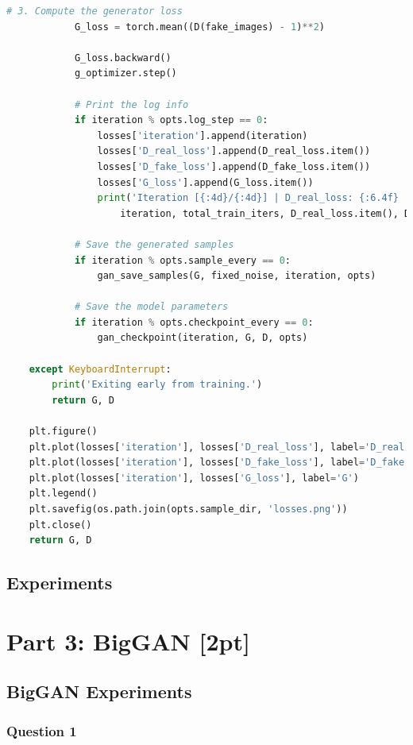 \documentclass{article}
\begin{document}
\begin{lstlisting}[language=python]
            # 3. Compute the generator loss
            G_loss = torch.mean((D(fake_images) - 1)**2)

            G_loss.backward()
            g_optimizer.step()

            # Print the log info
            if iteration % opts.log_step == 0:
                losses['iteration'].append(iteration)
                losses['D_real_loss'].append(D_real_loss.item())
                losses['D_fake_loss'].append(D_fake_loss.item())
                losses['G_loss'].append(G_loss.item())
                print('Iteration [{:4d}/{:4d}] | D_real_loss: {:6.4f} | D_fake_loss: {:6.4f} | G_loss: {:6.4f}'.format(
                    iteration, total_train_iters, D_real_loss.item(), D_fake_loss.item(), G_loss.item()))

            # Save the generated samples
            if iteration % opts.sample_every == 0:
                gan_save_samples(G, fixed_noise, iteration, opts)

            # Save the model parameters
            if iteration % opts.checkpoint_every == 0:
                gan_checkpoint(iteration, G, D, opts)

    except KeyboardInterrupt:
        print('Exiting early from training.')
        return G, D

    plt.figure()
    plt.plot(losses['iteration'], losses['D_real_loss'], label='D_real')
    plt.plot(losses['iteration'], losses['D_fake_loss'], label='D_fake')
    plt.plot(losses['iteration'], losses['G_loss'], label='G')
    plt.legend()
    plt.savefig(os.path.join(opts.sample_dir, 'losses.png'))
    plt.close()
    return G, D
	\end{lstlisting}
	\subsection{Experiments}
	
	\section{Part 3: BigGAN [2pt]}
	\subsection{BigGAN Experiments}
	\subsubsection{Question 1}
\end{document}
